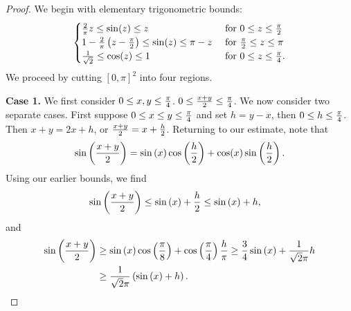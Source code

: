 \documentclass{amsart}
\begin{document}
\begin{proof}
We begin with elementary trigonometric bounds:
\[
\begin{cases}
{2\over \pi } z \leq \sin(z) \leq z &  \hbox{ for } 0 \leq z \leq {\pi \over 2} \\
1 - {2\over \pi } \left( z - {\pi \over 2} \right) \leq \sin(z) \leq \pi - z & \hbox{ for } {\pi \over 2} \leq z \leq {\pi }  \\
{1\over \sqrt{2}}  \leq \cos(z) \leq 1 &  \hbox{ for } 0 \leq z \leq {\pi \over 4}.
\end{cases}
\]
We proceed by cutting $[0,\pi]^2$ into four regions.

\textbf{Case 1.} We first consider $0\leq x,y \leq {\pi \over 4}$.  
$0 \leq {x + y \over 2} \leq {\pi \over 4}$.
We now consider two separate cases.  First suppose $0 \leq x \leq y \leq {\pi \over 4}$ and set $h = y-x$, then $0 \leq h \leq {\pi \over 4}$.  Then 
$x + y = 2x + h$, or ${x + y \over 2} = x + {h\over 2}$.  Returning to our estimate, note that
\[
\sin \left( {x + y\over 2} \right)
= \sin \left( x \right) \cos \left( {h\over 2} \right) + \cos(x) \sin\left( {h\over 2} \right).
\]
Using our earlier bounds, we find
\begin{align*}
\sin \left( {x + y\over 2} \right)
& \leq  \sin\left( x \right)  + {h \over 2}  \leq  \sin\left( x \right) + h ,
\end{align*}
and 
\begin{align*}
\sin \left( {x + y\over 2} \right) 
& \geq  \sin\left(x \right) \cos\left( {\pi \over 8} \right)+ \cos\left({\pi \over 4} \right) {h \over \pi}   \geq {3 \over 4} \sin\left( x\right) + {1 \over \sqrt{2} \pi}h \\
& \geq {1 \over \sqrt{2}\pi} \left( \sin\left( x\right) + h \right).
\end{align*}


\end{proof}
\end{document}
